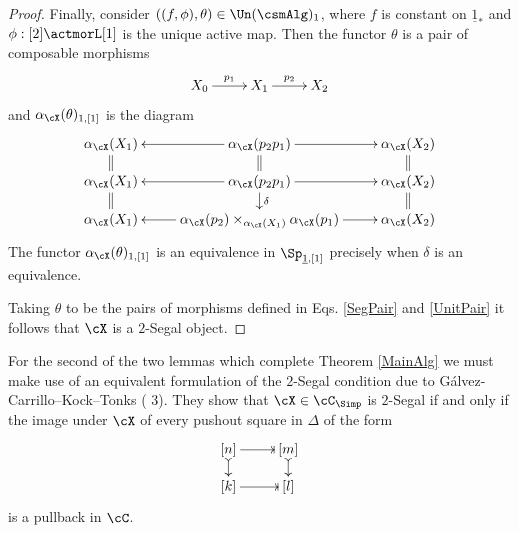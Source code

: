 \documentclass[a4paper]{article}
\numberwithin{equation}{section}
\begin{document}
\begin{proof}
Finally, consider $\left((f,\phi),\theta\right) \in \Un(\csmAlg)_1$, where $f$ is constant on $\underline{1}_\ast$ and $\phi:[2]\actmorL[1]$ is the unique active map. Then the functor $\theta$ is a pair of composable morphisms
\begin{equation*}
  \xymatrix{X_0 \ar[r]^-{p_1} & X_1 \ar[r]^-{p_2} & X_2}
\end{equation*}
and $\alpha_\cX(\theta)_{1,[1]}$ is the diagram
\begin{equation*}
 \xymatrixrowsep{.9pc} \xymatrix{ \alpha_\cX(X_1) & \alpha_\cX(p_2 p_1) \ar[r] \ar[l] & \alpha_\cX(X_2) \\
 \alpha_\cX(X_1) \ar@{=}[u] \ar@{=}[d] & \alpha_\cX(p_2 p_1) \ar[l] \ar@{=}[u] \ar[r] \ar[d]^-\delta & \alpha_\cX(X_2) \ar@{=}[u] \ar@{=}[d] \\
 \alpha_\cX(X_1) & \alpha_\cX(p_2) \times_{\alpha_\cX(X_1)} \alpha_\cX(p_1) \ar[r] \ar[l] & \alpha_\cX(X_2) }
\end{equation*}
The functor $\alpha_\cX(\theta)_{1,[1]}$ is an equivalence in $\Sp_{\underline{1},[1]}$ precisely when $\delta$ is an equivalence. 

Taking $\theta$ to be the pairs of morphisms defined in Eqs. \ref{SegPair} and \ref{UnitPair} it follows that $\cX$ is a $2$-Segal object.
\end{proof}

For the second of the two lemmas which complete Theorem \ref{MainAlg} we must make use of an equivalent formulation of the $2$-Segal condition due to G\'alvez-Carrillo--Kock--Tonks (\cite{KockI} 3). They show that $\cX \in \cC_\Simp$ is $2$-Segal if and only if the image under $\cX$ of every pushout square in $\Delta$ of the form
\begin{equation*}
 \xymatrixrowsep{.9pc} \xymatrix{ [n] \ar@{->|}[r] \ar@{>->}[d] & [m] \ar@{>->}[d] \\
 [k] \ar@{->|}[r] & [l]}
\end{equation*}
is a pullback in $\cC$.
\end{document}
